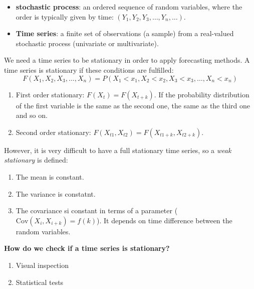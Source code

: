 \begin{itemize}
    \item \textbf{stochastic process}: an ordered sequence of random variables, where the
    order is typically given by time: $(Y_1, Y_2, Y_3, \dots, Y_n, \dots)$.
    \item \textbf{Time series}: a finite set of observations (a sample) from a real-valued
    stochastic process (univariate or multivariate).
\end{itemize}

We need a time series to be stationary in order to apply forecasting methods. A time series is stationary if these conditions are fulfilled:
$$
F(X_1, X_2, X_3, \dots, X_n) = P(X_1 < x_1, X_2 < x_2, X_3 < x_3, \dots, X_n < x_n)
$$
\begin{enumerate}
    \item First order stationary: $F(X_t) = F(X_{t +k})$. If the probability distribution of the first variable is the same as the second one, the same as the third one and so on.
    \item Second order stationary: $F(X_{t1}, X_{t2}) = F(X_{t1 + k}, X_{t2 + k})$.
\end{enumerate}

However, it is very difficult to have a full stationary time series, so a \textit{weak stationary} is defined:
\begin{enumerate}
    \item The mean is constant.
    \item The variance is constatnt.
    \item The covariance si constant in terms of a parameter ($\text{Cov}(X_i, X_{i+k})=f(k)$). It depends on time difference between the random variables.
\end{enumerate}

\textbf{How do we check if a time series is stationary?}
\begin{enumerate}
    \item Visual inspection
    \item Statistical tests
\end{enumerate}


